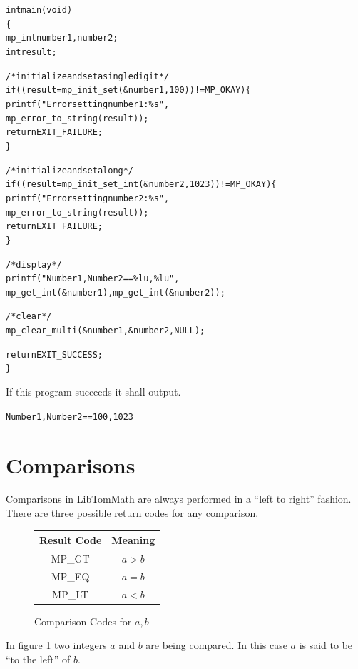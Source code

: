 \documentclass[synpaper]{book}
\begin{document}
\begin{alltt}
int main(void)
\{
   mp_int number1, number2;
   int    result;

   /* initialize and set a single digit */
   if ((result = mp_init_set(&number1, 100)) != MP_OKAY) \{
      printf("Error setting number1: \%s", 
             mp_error_to_string(result));
      return EXIT_FAILURE;
   \}             

   /* initialize and set a long */
   if ((result = mp_init_set_int(&number2, 1023)) != MP_OKAY) \{
      printf("Error setting number2: \%s", 
             mp_error_to_string(result));
      return EXIT_FAILURE;
   \}

   /* display */
   printf("Number1, Number2 == \%lu, \%lu",
          mp_get_int(&number1), mp_get_int(&number2));

   /* clear */
   mp_clear_multi(&number1, &number2, NULL);

   return EXIT_SUCCESS;
\}
\end{alltt}

If this program succeeds it shall output.
\begin{alltt}
Number1, Number2 == 100, 1023
\end{alltt}

\section{Comparisons}

Comparisons in LibTomMath are always performed in a ``left to right'' fashion.  There are three possible return codes
for any comparison.

  
\begin{figure}[here]
\begin{center}
\begin{tabular}{|c|c|}
\hline \textbf{Result Code} & \textbf{Meaning} \\
\hline MP\_GT & $a > b$ \\
\hline MP\_EQ & $a = b$ \\
\hline MP\_LT & $a < b$ \\
\hline
\end{tabular}
\end{center}
\caption{Comparison Codes for $a, b$}
\label{fig:CMP}
\end{figure}

In figure \ref{fig:CMP} two integers $a$ and $b$ are being compared.  In this case $a$ is said to be ``to the left'' of 
$b$.  
\end{document}
